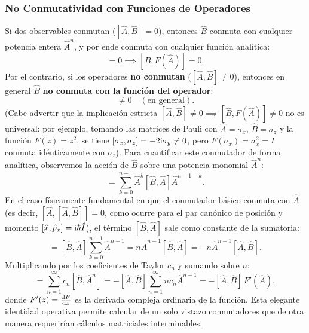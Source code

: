 \subsubsection{No Conmutatividad con Funciones de Operadores}

Si dos observables conmutan ($[\hat{A}, \hat{B}] = 0$), entonces $\hat{B}$ conmuta con cualquier potencia entera $\hat{A}^n$, y por ende conmuta con cualquier función analítica:
\begin{equation}
    [\hat{A}, \hat{B}] = 0 \implies [\hat{B}, F(\hat{A})] = 0.
\end{equation}
Por el contrario, si los operadores \textbf{no conmutan} ($[\hat{A}, \hat{B}] \neq 0$), entonces en general $\hat{B}$ \textbf{no conmuta con la función del operador}:
\begin{equation}
    [\hat{B}, F(\hat{A})] \neq 0 \quad (\text{en general}).
\end{equation}
(Cabe advertir que la implicación estricta $[\hat{A}, \hat{B}] \neq 0 \implies [\hat{B}, F(\hat{A})] \neq 0$ no es universal: por ejemplo, tomando las matrices de Pauli con $\hat{A} = \sigma_x$, $\hat{B} = \sigma_z$ y la función $F(z) = z^2$, se tiene $[\sigma_x, \sigma_z] = -2\mathrm{i}\sigma_y \neq 0$, pero $F(\sigma_x) = \sigma_x^2 = \hat{I}$ conmuta idénticamente con $\sigma_z$).
Para cuantificar este conmutador de forma analítica, observemos la acción de $\hat{B}$ sobre una potencia monomial $\hat{A}^n$:
\begin{equation}
    [\hat{B}, \hat{A}^n] = \sum_{k=0}^{n-1} \hat{A}^k [\hat{B}, \hat{A}] \hat{A}^{n-1-k}.
\end{equation}
En el caso físicamente fundamental en que el conmutador básico conmuta con $\hat{A}$ (es decir, $[\hat{A}, [\hat{A}, \hat{B}]] = 0$, como ocurre para el par canónico de posición y momento $[\hat{x}, \hat{p}_x] = \mathrm{i}\hbar\hat{I}$), el término $[\hat{B}, \hat{A}]$ sale como constante de la sumatoria:
\begin{equation}
    [\hat{B}, \hat{A}^n] = [\hat{B}, \hat{A}] \sum_{k=0}^{n-1} \hat{A}^{n-1} = n\hat{A}^{n-1}[\hat{B}, \hat{A}] = -n\hat{A}^{n-1}[\hat{A}, \hat{B}].
\end{equation}
Multiplicando por los coeficientes de Taylor $c_n$ y sumando sobre $n$:
\begin{equation}
    [\hat{B}, F(\hat{A})] = \sum_{n=1}^\infty c_n [\hat{B}, \hat{A}^n] = -[\hat{A}, \hat{B}] \sum_{n=1}^\infty n c_n \hat{A}^{n-1} = \boxed{-[\hat{A}, \hat{B}]\,F'(\hat{A})},
    \label{eq:comm_b_f_a}
\end{equation}
donde $F'(z) = \frac{\mathrm{d} F}{\mathrm{d} z}$ es la derivada compleja ordinaria de la función. Esta elegante identidad operativa permite calcular de un solo vistazo conmutadores que de otra manera requerirían cálculos matriciales interminables.

